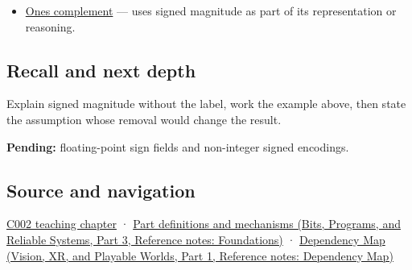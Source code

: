 \hypertarget{appendix-ce20506c8532-used-by}{}

\begin{itemize}
\tightlist
\item
  \hyperref[appendix-03c678cd40b3]{One\textquotesingle s complement} --- uses signed magnitude as part of its representation or reasoning.
\end{itemize}

\subsection{Recall and next depth}\label{appendix-ce20506c8532-recall-and-next-depth}

\hypertarget{appendix-ce20506c8532-recall-and-next-depth}{}

Explain signed magnitude without the label, work the example above, then state the assumption whose removal would change the result.

\textbf{Pending:} floating-point sign fields and non-integer signed encodings.

\subsection{Source and navigation}\label{appendix-ce20506c8532-source-and-navigation}

\hypertarget{appendix-ce20506c8532-source-and-navigation}{}

\hyperref[01-foundations-i-ch001-arithmetic-becomes-a-policy]{C002 teaching chapter} · \href{../01-Bits-Programs-and-Reliable-Systems-P03/main.pdf\#nameddest=appendix-fd090d982a15}{Part definitions and mechanisms (Bits, Programs, and Reliable Systems, Part 3, Reference notes: Foundations)} · \href{../07-Vision-XR-and-Playable-Worlds-P01/main.pdf\#nameddest=appendix-4ad47bdd269a}{Dependency Map (Vision, XR, and Playable Worlds, Part 1, Reference notes: Dependency Map)}
